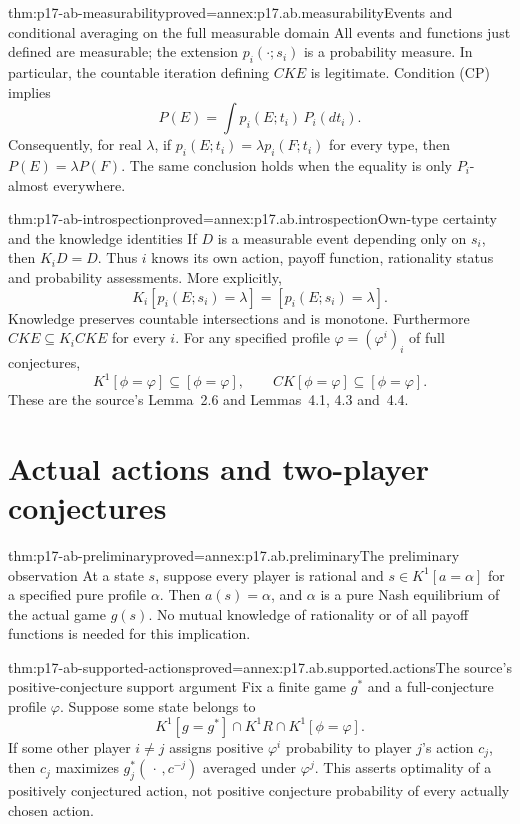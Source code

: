 \begin{hbtheorem}{thm:p17-ab-measurability}{proved=annex:p17.ab.measurability}{Events and conditional averaging on the full measurable domain}
All events and functions just defined are measurable; the extension
\(p_i(\cdot;s_i)\) is a probability measure. In particular, the
countable iteration defining \(CKE\) is legitimate. Condition (CP) implies
\[
 P(E)=\int p_i(E;t_i)\,P_i(dt_i).
\]
Consequently, for real \(\lambda\), if
\(p_i(E;t_i)=\lambda p_i(F;t_i)\) for every type,
then \(P(E)=\lambda P(F)\). The same conclusion holds when the
equality is only \(P_i\)-almost everywhere.
\end{hbtheorem}

\begin{hbtheorem}{thm:p17-ab-introspection}{proved=annex:p17.ab.introspection}{Own-type certainty and the knowledge identities}
If \(D\) is a measurable event depending only on \(s_i\), then
\(K_iD=D\). Thus \(i\) knows its own action, payoff function, rationality
status and probability assessments. More explicitly,
\[
 K_i[p_i(E;s_i)=\lambda]=[p_i(E;s_i)=\lambda].
\]
Knowledge preserves countable intersections and is monotone.
Furthermore \(CKE\subseteq K_iCKE\) for every \(i\).
For any specified profile \(\varphi=(\varphi^i)_i\) of full conjectures,
\[
 K^1[\phi=\varphi]\subseteq[\phi=\varphi],
 \qquad CK[\phi=\varphi]\subseteq[\phi=\varphi].
\]
These are the source's Lemma~2.6 and Lemmas~4.1, 4.3 and~4.4.
\end{hbtheorem}

\section{Actual actions and two-player conjectures}

\begin{hbtheorem}{thm:p17-ab-preliminary}{proved=annex:p17.ab.preliminary}{The preliminary observation}
At a state \(s\), suppose every player is rational and
\(s\in K^1[a=\alpha]\) for a specified pure profile \(\alpha\).
Then \(a(s)=\alpha\), and \(\alpha\) is a pure Nash equilibrium
of the actual game \(g(s)\). No mutual knowledge of rationality
or of all payoff functions is needed for this implication.
\end{hbtheorem}

\begin{hblemma}{thm:p17-ab-supported-actions}{proved=annex:p17.ab.supported.actions}{The source's positive-conjecture support argument}
Fix a finite game \(g^*\) and a full-conjecture profile \(\varphi\).
Suppose some state belongs to
\[
             K^1[g=g^*]\cap K^1R\cap K^1[\phi=\varphi].
\]
If some other player \(i\ne j\) assigns positive \(\varphi^i\)
probability to player \(j\)'s action \(c_j\), then \(c_j\)
maximizes \(g_j^*(\,\cdot\,,c^{-j})\) averaged under \(\varphi^j\).
This asserts optimality of a positively conjectured action,
not positive conjecture probability of every actually chosen action.
\end{hblemma}

